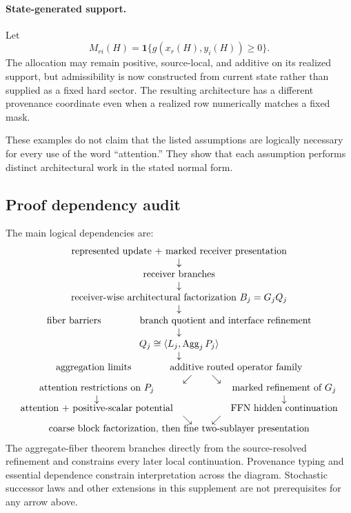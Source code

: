\paragraph{State-generated support.}
Let
\[
M_{ri}(H)=\mathbf 1\{g(x_r(H),y_i(H))\ge0\}.
\]
The allocation may remain positive, source-local, and additive on its realized support, but admissibility is now constructed from current state rather than supplied as a fixed hard sector. The resulting architecture has a different provenance coordinate even when a realized row numerically matches a fixed mask.

These examples do not claim that the listed assumptions are logically necessary for every use of the word ``attention.'' They show that each assumption performs distinct architectural work in the stated normal form.

\subsection{Proof dependency audit}

The main logical dependencies are:
\[
\begin{array}{c}
\text{represented update + marked receiver presentation}\\
\downarrow\\
\text{receiver branches}\\
\downarrow\\
\text{receiver-wise architectural factorization }B_j=G_jQ_j\\
\downarrow\\
\begin{array}{ccc}
\text{fiber barriers}
&\qquad&
\text{branch quotient and interface refinement}
\end{array}\\
\downarrow\\
Q_j\cong\langle L_j,\Agg_jP_j\rangle\\
\downarrow\\
\begin{array}{ccc}
\text{aggregation limits}
&\qquad&
\text{additive routed operator family}
\end{array}\\
\begin{array}{ccc}
&\swarrow\qquad\searrow&\\[-1mm]
\text{attention restrictions on }P_j
&&
\text{marked refinement of }G_j\\
\downarrow&&\downarrow\\[-1mm]
\text{attention + positive-scalar potential}
&&
\text{FFN hidden continuation}\\
&\searrow\qquad\swarrow&\\[-1mm]
\multicolumn{3}{c}{\text{coarse block factorization, then fine two-sublayer presentation}}
\end{array}
\end{array}
\]
The aggregate-fiber theorem branches directly from the source-resolved refinement and constrains every later local continuation. Provenance typing and essential dependence constrain interpretation across the diagram. Stochastic successor laws and other extensions in this supplement are not prerequisites for any arrow above.

